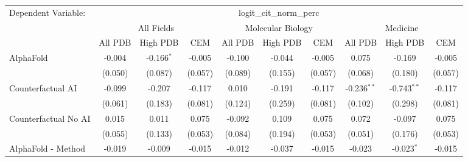 \begingroup
\centering
\begin{tabular}{lccccccccc}
   \tabularnewline \midrule \midrule
   Dependent Variable: & \multicolumn{9}{c}{logit\_cit\_norm\_perc}\\
 & \multicolumn{3}{c}{All Fields} & \multicolumn{3}{c}{Molecular Biology} & \multicolumn{3}{c}{Medicine} \\
\cmidrule(lr){2-7} \cmidrule(lr){5-10} \cmidrule(lr){8-7}
 & \multicolumn{1}{c}{All PDB} & \multicolumn{1}{c}{High PDB} & \multicolumn{1}{c}{CEM} & \multicolumn{1}{c}{All PDB} & \multicolumn{1}{c}{High PDB} & \multicolumn{1}{c}{CEM} & \multicolumn{1}{c}{All PDB} & \multicolumn{1}{c}{High PDB} & \multicolumn{1}{c}{CEM} \\
\cmidrule(lr){2-3} \cmidrule(lr){3-4} \cmidrule(lr){4-5} \cmidrule(lr){5-6} \cmidrule(lr){6-7} \cmidrule(lr){7-8} \cmidrule(lr){8-9} \cmidrule(lr){9-10} \cmidrule(lr){10-3}
   AlphaFold                                                   & -0.004        & -0.166$^{*}$   & -0.005        & -0.100         & -0.044         & -0.005        & 0.075          & -0.169         & -0.005\\   
                                                               & (0.050)       & (0.087)        & (0.057)       & (0.089)        & (0.155)        & (0.057)       & (0.068)        & (0.180)        & (0.057)\\   
   Counterfactual AI                                           & -0.099        & -0.207         & -0.117        & 0.010          & -0.191         & -0.117        & -0.236$^{**}$  & -0.743$^{**}$  & -0.117\\   
                                                               & (0.061)       & (0.183)        & (0.081)       & (0.124)        & (0.259)        & (0.081)       & (0.102)        & (0.298)        & (0.081)\\   
   Counterfactual No AI                                        & 0.015         & 0.011          & 0.075         & -0.092         & 0.109          & 0.075         & 0.072          & -0.097         & 0.075\\   
                                                               & (0.055)       & (0.133)        & (0.053)       & (0.084)        & (0.194)        & (0.053)       & (0.051)        & (0.176)        & (0.053)\\   
   AlphaFold - Method                                          & -0.019        & -0.009         & -0.015        & -0.012         & -0.037         & -0.015        & -0.023         & -0.023$^{*}$   & -0.015\\   

\end{tabular}
